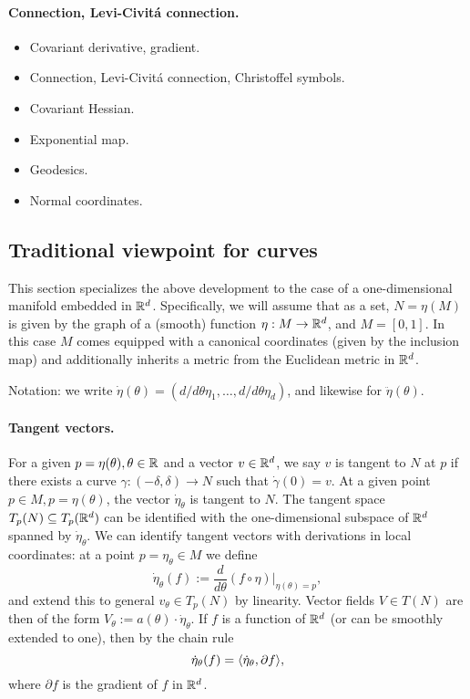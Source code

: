 \documentclass{article}
\newcommand{\ag}[1]{{\bf{{\red{[{AG: #1}]}}}}}
\begin{document}
	\paragraph{Connection, Levi-Civit\'{a} connection.}  
	
	\ag{TO COME}

	
	
	
	\begin{itemize}
		\item Covariant derivative, gradient.
		\item Connection,  Levi-Civit\'{a} connection, Christoffel symbols.
		\item Covariant Hessian.
		\item Exponential map.
		\item Geodesics.
		\item Normal coordinates.
	\end{itemize}
	
	
	\subsection{Traditional viewpoint for curves}
	\label{subsec:traditional-viewpoint}
	
	This section specializes the above development to the case of a one-dimensional manifold embedded in $\mathbb{R}^d$. Specifically, we will assume that as a set, $N = \eta(M)$ is given by the graph of a (smooth) function $\eta: M \to \mathbb{R}^d$, and $M = [0,1]$. In this case $M$ comes equipped with a canonical coordinates (given by the inclusion map) and additionally inherits a metric from the Euclidean metric in $\mathbb{R}^d$.
	
	Notation: we write $\dot{\eta}(\theta) = (d/d\theta \eta_1,\ldots,d/d\theta \eta_d)$, and likewise for $\ddot{\eta}(\theta)$.  
	
	\paragraph{Tangent vectors.}
	For a given $p = \eta(\theta), \theta \in \mathbb{R}$ and a vector $v \in \mathbb{R}^d$, we say $v$ is tangent to $N$ at $p$ if there exists a curve $\gamma: (-\delta,\delta) \to N$ such that $\dot{\gamma}(0) = v$. At a given point $p \in M, p = \eta(\theta)$, the vector $\dot{\eta}_{\theta}$ is tangent to $N$. The tangent space $T_{p}(N) \subseteq T_{p}(\mathbb{R}^d)$ can be identified with the one-dimensional subspace of $\mathbb{R}^d$ spanned by $\dot{\eta}_{\theta}$. We can identify tangent vectors with derivations in local coordinates: at a point $p = \eta_{\theta} \in M$ we define
	\begin{equation}
	\label{eqn:curve-derivation}
		\dot{\eta}_{\theta}(f) := \frac{d}{d\theta} (f \circ \eta)\Big|_{\eta(\theta) = p},
	\end{equation}
	and extend this to general $v_{\theta} \in T_{p}(N)$ by linearity. Vector fields $V \in T(N)$ are then of the form $V_{\theta} := a(\theta) \cdot \dot{\eta}_{\theta}$. If $f$ is a function of $\mathbb{R}^d$ (or can be smoothly extended to one), then by the chain rule
	\begin{equation*}
		\dot{\eta}_{\theta}(f) = \langle \dot{\eta}_{\theta}, \partial f \rangle,
	\end{equation*}
	where $\partial f$ is the gradient of $f$ in $\mathbb{R}^d$. 
	
\end{document}

